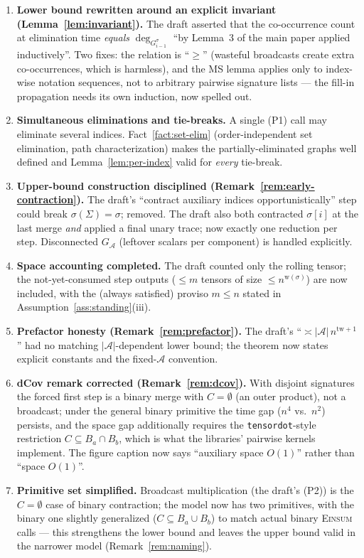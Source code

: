 \documentclass[11pt]{article}
\newcommand{\Einsum}{\textsc{Einsum}}
\newcommand{\calA}{\mathcal{A}}
\newcommand{\tw}{\mathrm{tw}}
\newcommand{\graphform}[1]{G_{#1}}
\newcommand{\wid}{\mathrm{w}}
\theoremstyle{plain}
\theoremstyle{definition}
\theoremstyle{remark}
\begin{document}
\begin{enumerate}
\item \textbf{Lower bound rewritten around an explicit invariant
(Lemma~\ref{lem:invariant}).}  The draft asserted that the co-occurrence
count at elimination time \emph{equals} $\deg_{G^\sigma_{i-1}}$ ``by
Lemma~3 of the main paper applied inductively''.  Two fixes: the relation
is ``$\ge$'' (wasteful broadcasts create extra co-occurrences, which is
harmless), and the MS lemma applies only to index-wise notation
sequences, not to arbitrary pairwise signature lists --- the fill-in
propagation needs its own induction, now spelled out.
\item \textbf{Simultaneous eliminations and tie-breaks.}  A single (P1)
call may eliminate several indices.  Fact~\ref{fact:set-elim}
(order-independent set elimination, path characterization) makes the
partially-eliminated graphs well defined and
Lemma~\ref{lem:per-index} valid for \emph{every} tie-break.
\item \textbf{Upper-bound construction disciplined
(Remark~\ref{rem:early-contraction}).}  The draft's ``contract auxiliary
indices opportunistically'' step could break $\sigma(\Sigma)=\sigma$;
removed.  The draft also both contracted $\sigma[i]$ at the last merge
\emph{and} applied a final unary trace; now exactly one reduction per
step.  Disconnected $\graphform{\calA}$ (leftover scalars per component)
is handled explicitly.
\item \textbf{Space accounting completed.}  The draft counted only the
rolling tensor; the not-yet-consumed step outputs ($\le m$ tensors of
size $\le n^{\wid(\sigma)}$) are now included, with the (always satisfied)
proviso $m \le n$ stated in Assumption~\ref{ass:standing}(iii).
\item \textbf{Prefactor honesty (Remark~\ref{rem:prefactor}).}  The
draft's ``$\asymp |\calA|\, n^{\tw+1}$'' had no matching
$|\calA|$-dependent lower bound; the theorem now states explicit
constants and the fixed-$\calA$ convention.
\item \textbf{dCov remark corrected (Remark~\ref{rem:dcov}).}  With
disjoint signatures the forced first step is a binary merge with
$C=\emptyset$ (an outer product), not a broadcast; under the general
binary primitive the time gap ($n^4$ vs.\ $n^2$) persists, and the space
gap additionally requires the \texttt{tensordot}-style restriction $C
\subseteq B_a \cap B_b$, which is what the libraries' pairwise kernels
implement.  The figure caption now says ``auxiliary space $O(1)$''
rather than ``space $O(1)$''.
\item \textbf{Primitive set simplified.}  Broadcast multiplication (the
draft's (P2)) is the $C=\emptyset$ case of binary contraction; the model
now has two primitives, with the binary one slightly generalized
($C \subseteq B_a \cup B_b$) to match actual binary \Einsum{} calls ---
this strengthens the lower bound and leaves the upper bound valid in the
narrower model (Remark~\ref{rem:naming}).
\end{enumerate}
\end{document}
